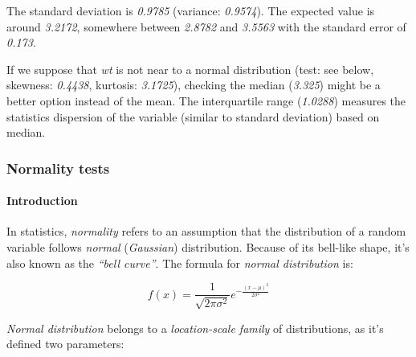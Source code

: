\documentclass[]{article}
\begin{document}
The standard deviation is \emph{0.9785} (variance: \emph{0.9574}). The
expected value is around \emph{3.2172}, somewhere between \emph{2.8782}
and \emph{3.5563} with the standard error of \emph{0.173}.

If we suppose that \emph{wt} is not near to a normal distribution (test:
see below, skewness: \emph{0.4438}, kurtosis: \emph{3.1725}), checking
the median (\emph{3.325}) might be a better option instead of the mean.
The interquartile range (\emph{1.0288}) measures the statistics
dispersion of the variable (similar to standard deviation) based on
median.

\subsubsection{Normality tests}

\paragraph{Introduction}

In statistics, \emph{normality} refers to an assumption that the
distribution of a random variable follows \emph{normal}
(\emph{Gaussian}) distribution. Because of its bell-like shape, it's
also known as the \emph{``bell curve''}. The formula for \emph{normal
distribution} is:

\[f(x) = \frac{1}{\sqrt{2\pi{}\sigma{}^2}} e^{-\frac{(x-\mu{})^2}{2\sigma{}^2}}\]

\emph{Normal distribution} belongs to a \emph{location-scale family} of
distributions, as it's defined two parameters:
\end{document}
